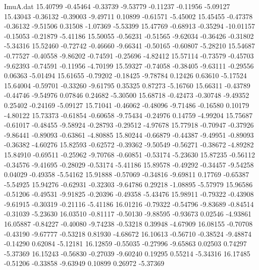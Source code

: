 \begin{filecontents}{ImuA.dat}
  15.40799   -0.45464   -0.33739   -9.53779   -0.11237   -0.11956   -5.09127
  15.43043   -0.36132   -0.39003   -9.49711    0.10899   -0.61571   -5.45002
  15.45455   -0.47378   -0.36132   -9.51506    0.31508   -1.07369   -5.53399
  15.47769   -0.68913   -0.35294  -10.01157   -0.15053   -0.21879   -5.41186
  15.50055   -0.56231   -0.51565   -9.62034   -0.36426   -0.31802   -5.34316
  15.52460   -0.72742   -0.46660   -9.66341   -0.50165   -0.60807   -5.28210
  15.54687   -0.77527   -0.40558   -9.86202   -0.74591   -0.25696   -4.82412
  15.57114   -0.73579   -0.45703   -9.62393   -0.74591   -0.11956   -4.70199
  15.59327   -0.74058   -0.38405   -9.63111   -0.29556    0.06363   -5.01494
  15.61655   -0.79202   -0.18425   -9.78784    0.12426    0.63610   -5.17524
  15.64004   -0.59701   -0.33260   -9.61795    0.35325    0.87273   -5.16760
  15.66311   -0.43789   -0.44746   -9.54976    0.07846    0.24682   -5.30500
  15.68718   -0.42473   -0.30748   -9.49352    0.25402   -0.24169   -5.09127
  15.71041   -0.46062   -0.48096   -9.71486   -0.16580    0.10179   -4.80122
  15.73373   -0.61854   -0.60658   -9.75434   -0.24976    0.14759   -4.99204
  15.75687   -0.61017   -0.48455   -9.58924   -0.28793   -0.29512   -4.97678
  15.77918   -0.70947   -0.37926   -9.86441   -0.89093   -0.63861   -4.80885
  15.80244   -0.66879   -0.44387   -9.49951   -0.89093   -0.36382   -4.60276
  15.82593   -0.62572   -0.39362   -9.50549   -0.56271   -0.38672   -4.89282
  15.84910   -0.69511   -0.25962   -9.70768   -0.60851   -0.53174   -5.23630
  15.87235   -0.56112   -0.34576   -9.41695   -0.28029   -0.53174   -5.41186
  15.89578   -0.49292   -0.34457   -9.54258    0.04029   -0.49358   -5.54162
  15.91888   -0.57069   -0.34816   -9.69811    0.17769   -0.65387   -5.54925
  15.94276   -0.62931   -0.32303   -9.64786    0.29218   -1.08895   -5.57979
  15.96586   -0.51206   -0.49531   -9.91825   -0.20396   -0.49358   -5.43476
  15.98911   -0.79322   -0.43908   -9.61915   -0.30319   -0.21116   -5.41186
  16.01216   -0.79322   -0.54796   -9.83689   -0.84514   -0.31039   -5.23630
  16.03510   -0.81117   -0.50130   -9.88595   -0.93673    0.02546   -4.93861
  16.05887   -0.84227   -0.40080   -9.74238   -0.53218    0.39948   -4.67909
  16.08155   -0.70708   -0.43190   -9.67777   -0.53218    0.81930   -4.68672
  16.10613   -0.56710   -0.38524   -9.48874   -0.14290    0.62084   -5.12181
  16.12859   -0.55035   -0.27996   -9.65863    0.02503    0.74297   -5.37369
  16.15243   -0.56830   -0.27039   -9.60240    0.19295    0.55214   -5.34316
  16.17485   -0.51206   -0.33858   -9.63949    0.10899    0.26972   -5.37369

\end{filecontents}
